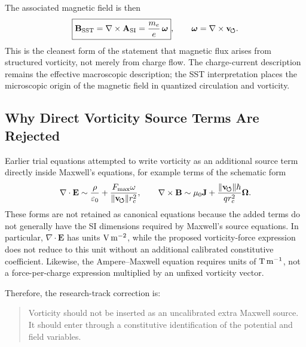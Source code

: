     The associated magnetic field is then
    \begin{equation}
        \boxed{
            \mathbf{B}_{\rm SST}
            =
            \nabla\times\mathbf{A}_{\rm SI}
            =
            \frac{m_e}{e}\,
            \boldsymbol{\omega}
        },
        \qquad
        \boldsymbol{\omega}
        =
        \nabla\times\mathbf{v}_{\!\boldsymbol{\circlearrowleft}} .
        \label{eq:B_from_vorticity}
    \end{equation}
    This is the cleanest form of the statement that magnetic flux arises from
    structured vorticity, not merely from charge flow.  The charge-current
    description remains the effective macroscopic description; the SST
    interpretation places the microscopic origin of the magnetic field in
    quantized circulation and vorticity.

\subsection{Why Direct Vorticity Source Terms Are Rejected}
    
    Earlier trial equations attempted to write vorticity as an additional
    source term directly inside Maxwell's equations, for example terms of the
    schematic form
    \begin{equation}
        \nabla\cdot\mathbf{E}
        \sim
        \frac{\rho}{\varepsilon_0}
        +
        \frac{F_{\max}\omega}{\lVert\mathbf{v}_{\!\boldsymbol{\circlearrowleft}}\rVert r_c^2},
        \qquad
        \nabla\times\mathbf{B}
        \sim
        \mu_0\mathbf{J}
        +
        \frac{\lVert\mathbf{v}_{\!\boldsymbol{\circlearrowleft}}\rVert\hbar}{qr_c^2}\boldsymbol{\Omega}.
        \label{eq:rejected_direct_source_terms}
    \end{equation}
    These forms are not retained as canonical equations because the added
    terms do not generally have the SI dimensions required by Maxwell's
    source equations.  In particular,
    \(\nabla\cdot\mathbf{E}\) has units
    \({\rm V\,m^{-2}}\), while the proposed vorticity-force expression does
    not reduce to this unit without an additional calibrated constitutive
    coefficient.  Likewise, the Ampere--Maxwell equation requires units of
    \({\rm T\,m^{-1}}\), not a force-per-charge expression multiplied by an
    unfixed vorticity vector.
    
    Therefore, the research-track correction is:
    
    \begin{quote}
        Vorticity should not be inserted as an uncalibrated extra Maxwell source.
        It should enter through a constitutive identification of the potential and
        field variables.
    \end{quote}
    

